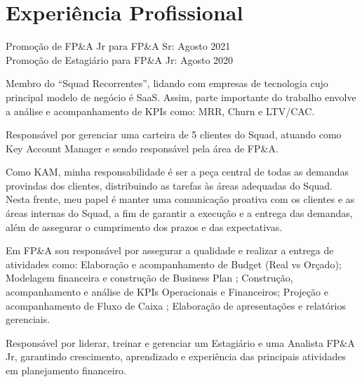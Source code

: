 \documentclass[]{deedy-resume-openfont}
\begin{document}
%
%

%
%

%
%

\begin{minipage}[t]{0.52\textwidth} 


\section{Experiência Profissional}
Promoção de FP\&A Jr para FP\&A Sr: Agosto 2021 \\
Promoção de Estagiário para FP\&A Jr: Agosto 2020
\vspace{\topsep} %
\begin{tightemize}
\item Membro do “Squad Recorrentes”, lidando com empresas de tecnologia cujo principal modelo de negócio é SaaS. Assim, parte importante do trabalho envolve a análise e acompanhamento de KPIs como: MRR, Churn e LTV/CAC.
\item Responsável por gerenciar uma carteira de 5 clientes do Squad, atuando como Key Account Manager e sendo responsável pela área de FP\&A.
\item Como KAM, minha responsabilidade é ser a peça central de todas as demandas provindas dos clientes, distribuindo as tarefas às áreas adequadas do Squad. Nesta frente, meu papel é manter uma comunicação proativa com os clientes e as áreas internas do Squad, a fim de garantir a execução e a entrega das demandas, além de assegurar o cumprimento dos prazos e das expectativas.
\item Em FP\&A sou responsável por assegurar a qualidade e realizar a entrega de atividades como: Elaboração e acompanhamento de Budget (Real vs Orçado); Modelagem financeira e construção de Business Plan ; Construção, acompanhamento e análise de KPIs Operacionais e Financeiros; Projeção e acompanhamento de Fluxo de Caixa ; Elaboração de apresentações e relatórios gerenciais.
\item Responsável por liderar, treinar e gerenciar um Estagiário e uma Analista FP\&A Jr, garantindo crescimento, aprendizado e experiência das principais atividades em planejamento financeiro.
\end{tightemize}
\sectionsep


\end{minipage}
\end{document}
